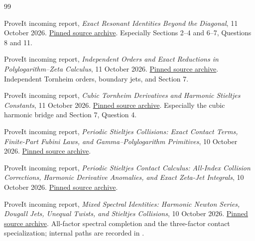 \begin{thebibliography}{99}
\small
\setlength{\itemsep}{3pt}
\setlength{\parskip}{0pt}

ProveIt incoming report,
\emph{Exact Resonant Identities Beyond the Diagonal}, 11 October 2026.
\href{https://github.com/VladimirReshetnikov/ProveIt/blob/c2cb285b64273e4cb2c8d7a03c68a4a99ac812d4/docs/incoming/ProveIt_Exact_Resonant_Identities_2026-10-11.zip}{Pinned source archive}.
Especially Sections 2--4 and 6--7, Questions 8 and 11.

ProveIt incoming report,
\emph{Independent Orders and Exact Reductions in Polylogarithm--Zeta
Calculus}, 11 October 2026.
\href{https://github.com/VladimirReshetnikov/ProveIt/blob/c2cb285b64273e4cb2c8d7a03c68a4a99ac812d4/docs/incoming/ProveIt_Independent_Orders_2026-10-11.zip}{Pinned source archive}.
Independent Tornheim orders, boundary jets, and Section 7.

ProveIt incoming report,
\emph{Cubic Tornheim Derivatives and Harmonic Stieltjes Constants},
11 October 2026.
\href{https://github.com/VladimirReshetnikov/ProveIt/blob/c2cb285b64273e4cb2c8d7a03c68a4a99ac812d4/docs/incoming/ProveIt_Cubic_Harmonic_Mixed_Orders_2026-10-11.zip}{Pinned source archive}.
Especially the cubic harmonic bridge and Section 7, Question 4.

ProveIt incoming report,
\emph{Periodic Stieltjes Collisions: Exact Contact Terms, Finite-Part
Fubini Laws, and Gamma--Polylogarithm Primitives}, 10 October 2026.
\href{https://github.com/VladimirReshetnikov/ProveIt/blob/c2cb285b64273e4cb2c8d7a03c68a4a99ac812d4/docs/incoming/ProveIt_Periodic_Collision_Contacts_2026-10-10.zip}{Pinned source archive}.

ProveIt incoming report,
\emph{Periodic Stieltjes Contact Calculus: All-Index Collision
Corrections, Harmonic Derivative Anomalies, and Exact Zeta-Jet
Integrals}, 10 October 2026.
\href{https://github.com/VladimirReshetnikov/ProveIt/blob/c2cb285b64273e4cb2c8d7a03c68a4a99ac812d4/docs/incoming/ProveIt_Periodic_Stieltjes_Contact_2026-10-10.zip}{Pinned source archive}.

ProveIt incoming report,
\emph{Mixed Spectral Identities: Harmonic Newton Series, Dougall Jets,
Unequal Twists, and Stieltjes Collisions}, 10 October 2026.
\href{https://github.com/VladimirReshetnikov/ProveIt/blob/c2cb285b64273e4cb2c8d7a03c68a4a99ac812d4/docs/incoming/ProveIt_Mixed_Spectral_Identities_2026-10-10.zip}{Pinned source archive}.
All-factor spectral completion and the three-factor contact
specialization; internal paths are recorded in .


\end{thebibliography}
